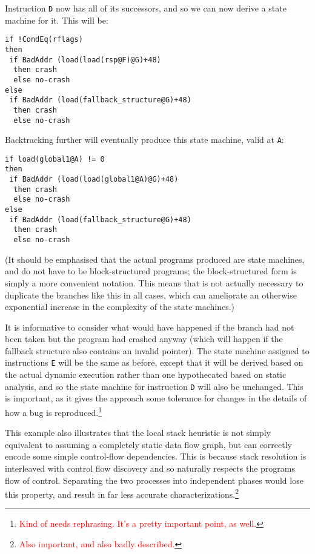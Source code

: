 \documentclass[10pt,twocolumn,preprint,natbib,authoryear]{sigplanconf}
\newcommand{\editorial}[1]{\textcolor{red}{\footnote{\textcolor{red}{#1}}}}
\begin{document}
Instruction \verb|D| now has all of its successors, and so we can
now derive a state machine for it.  This will be:

\begin{verbatim}
if !CondEq(rflags)
then
 if BadAddr (load(load(rsp@F)@G)+48)
  then crash
  else no-crash
else
 if BadAddr (load(fallback_structure@G)+48)
  then crash
  else no-crash
\end{verbatim}

Backtracking further will eventually produce this state machine, valid
at \verb|A|:

\begin{verbatim}
if load(global1@A) != 0
then
 if BadAddr (load(load(global1@A)@G)+48)
  then crash
  else no-crash
else
 if BadAddr (load(fallback_structure@G)+48)
  then crash
  else no-crash
\end{verbatim}

(It should be emphasised that the actual programs produced are state
machines, and do not have to be block-structured programs; the
block-structured form is simply a more convenient notation.  This
means that is not actually necessary to duplicate the branches like
this in all cases, which can ameliorate an otherwise exponential
increase in the complexity of the state machines.)

It is informative to consider what would have happened if the branch
had not been taken but the program had crashed anyway (which will
happen if the fallback structure also contains an invalid pointer).
The state machine assigned to instructions \verb|E| will be the same
as before, except that it will be derived based on the actual dynamic
execution rather than one hypothecated based on static analysis, and
so the state machine for instruction \verb|D| will also be unchanged.
This is important, as it gives the approach some tolerance for changes
in the details of how a bug is reproduced.\editorial{Kind of needs
  rephrasing.  It's a pretty important point, as well.}

This example also illustrates that the local stack heuristic is not
simply equivalent to assuming a completely static data flow graph, but
can correctly encode some simple control-flow dependencies.  This is
because stack resolution is interleaved with control flow discovery
and so naturally respects the programs flow of control.  Separating
the two processes into independent phases would lose this property,
and result in far less accurate characterizations.\editorial{Also
  important, and also badly described.}
\end{document}

